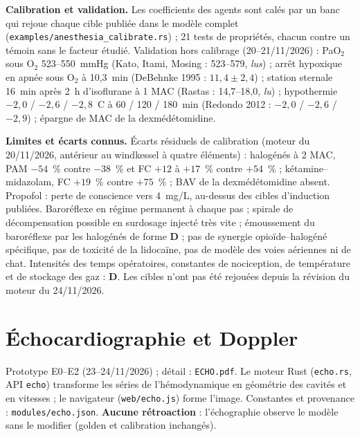 \documentclass[10pt,a4paper]{article}
\newcommand{\cmd}[1]{\texttt{#1}}
\newcommand{\evD}{\textcolor{red!70!black}{\textbf{D}}}
\newcommand{\acc}[1]{\textsl{#1}}
\newcommand{\limite}[1]{\par\textbf{Limites et écarts connus.} #1}
\begin{document}
\textbf{Calibration et validation.} Les coefficients des agents sont calés par un banc qui rejoue chaque cible publiée dans le modèle complet (\cmd{examples/anesthesia\_calibrate.rs}) ; 21 tests de propriétés, chacun contre un témoin sans le facteur étudié. Validation hors calibrage (20--21/11/2026) : PaO$_2$ sous O$_2$ 523--550~mmHg (Kato, Itami, Mosing : 523--579, \acc{lus}) ; arrêt hypoxique en apnée sous O$_2$ à 10,3~min (DeBehnke 1995 : $11{,}4 \pm 2{,}4$) ; station sternale 16~min après 2~h d'isoflurane à 1 MAC (Rastas : 14,7--18,0, \acc{lu}) ; hypothermie $-2{,}0$ / $-2{,}6$ / $-2{,}8$~\degre C à 60 / 120 / 180~min (Redondo 2012 : $-2{,}0$ / $-2{,}6$ / $-2{,}9$) ; épargne de MAC de la dexmédétomidine.

\limite{Écarts résiduels de calibration (moteur du 20/11/2026, antérieur au windkessel à quatre éléments) : halogénés à 2 MAC, PAM $-54$~\% contre $-38$~\% et FC $+12$ à $+17$~\% contre $+54$~\% ; kétamine--midazolam, FC $+19$~\% contre $+75$~\% ; BAV de la dexmédétomidine absent. Propofol : perte de conscience vers 4~mg/L, au-dessus des cibles d'induction publiées. Baroréflexe en régime permanent à chaque pas ; spirale de décompensation possible en surdosage injecté très vite ; émoussement du baroréflexe par les halogénés de forme \evD{} ; pas de synergie opioïde--halogéné spécifique, pas de toxicité de la lidocaïne, pas de modèle des voies aériennes ni de chat. Intensités des temps opératoires, constantes de nociception, de température et de stockage des gaz : \evD{}. Les cibles n'ont pas été rejouées depuis la révision du moteur du 24/11/2026.}

\section{Échocardiographie et Doppler}\label{sec:echo}

Prototype E0--E2 (23--24/11/2026) ; détail : \cmd{ECHO.pdf}. Le moteur Rust (\cmd{echo.rs}, API \cmd{echo}) transforme les séries de l'hémodynamique en géométrie des cavités et en vitesses ; le navigateur (\cmd{web/echo.js}) forme l'image. Constantes et provenance : \cmd{modules/echo.json}. \textbf{Aucune rétroaction} : l'échographie observe le modèle sans le modifier (golden et calibration inchangés).
\end{document}
